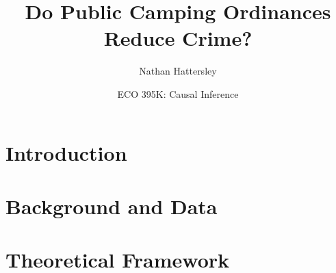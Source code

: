 \documentclass{article}
\author{Nathan Hattersley}
\title{Do Public Camping Ordinances Reduce Crime?}
\date{ECO 395K: Causal Inference}
\begin{document}
    \maketitle
    \section{Introduction}
    
    \section{Background and Data}
    
    \section{Theoretical Framework}
    
\end{document}
